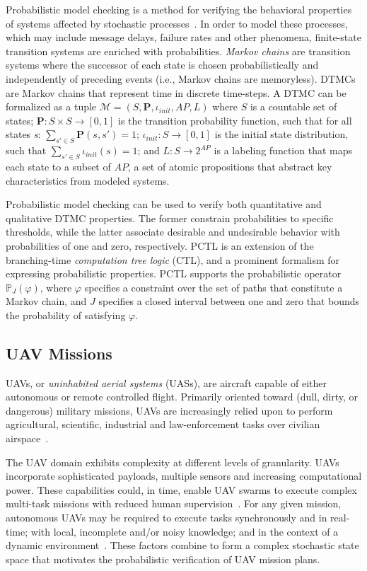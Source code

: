 \noindent Probabilistic model checking is a method for verifying the behavioral properties of systems affected by stochastic processes~\cite{Baier_2008,Kwiatkowska_2012}. In order to model these processes, which may include message delays, failure rates and other phenomena, finite-state transition systems are enriched with probabilities. \emph{Markov chains} are transition systems where the successor of each state is chosen probabilistically and independently of preceding events (i.e., Markov chains are memoryless). DTMCs are Markov chains that represent time in discrete time-steps. A DTMC can be formalized as a tuple $\mathcal{M} = (S, \mathbf{P}, \iota_{init}, AP, L)$ where $S$ is a countable set of states; $\mathbf{P}: S \times S \rightarrow [0, 1]$ is the transition probability function, such that for all states \emph{s}: $\sum_{s' \in S} \mathbf{P}(s, s') = 1$; $\iota_{init}: S \rightarrow [0, 1]$ is the initial state distribution, such that $\sum_{s' \in S} \iota_{init}(s) = 1$; and $L: S \rightarrow 2^{AP}$ is a labeling function that maps each state to a subset of $AP$, a set of atomic propositions that abstract key characteristics from modeled systems.

Probabilistic model checking can be used to verify both quantitative and qualitative DTMC properties. The former constrain probabilities to specific thresholds, while the latter associate desirable and undesirable behavior with probabilities of one and zero, respectively. PCTL is an extension of the branching-time \emph{computation tree logic} (CTL), and a prominent formalism for expressing probabilistic properties. PCTL supports the probabilistic operator $\mathbb{P}_{J}(\varphi)$, where $\varphi$ specifies a constraint over the set of paths that constitute a Markov chain, and $J$ specifies a closed interval between one and zero that bounds the probability of satisfying $\varphi$.

\subsection{UAV Missions}

\noindent UAVs, or \emph{uninhabited aerial systems} (UASs), are aircraft capable of either autonomous or remote controlled flight. Primarily oriented toward (dull, dirty, or dangerous) military missions, UAVs are increasingly relied upon to perform agricultural, scientific, industrial and law-enforcement tasks over civilian airspace~\cite{Rango_2010,Jimenez_Berni_2009,Heintz_2007}.

The UAV domain exhibits complexity at different levels of granularity. UAVs incorporate sophisticated payloads, multiple sensors and increasing computational power. These capabilities could, in time, enable UAV swarms to execute complex multi-task missions with reduced human supervision~\cite{Karaman_2008}. For any given mission, autonomous UAVs may be required to execute tasks synchronously and in real-time; with local, incomplete and/or noisy knowledge; and in the context of a dynamic environment~\cite{Tosic_2003}. These factors combine to form a complex stochastic state space that motivates the probabilistic verification of UAV mission plans.
